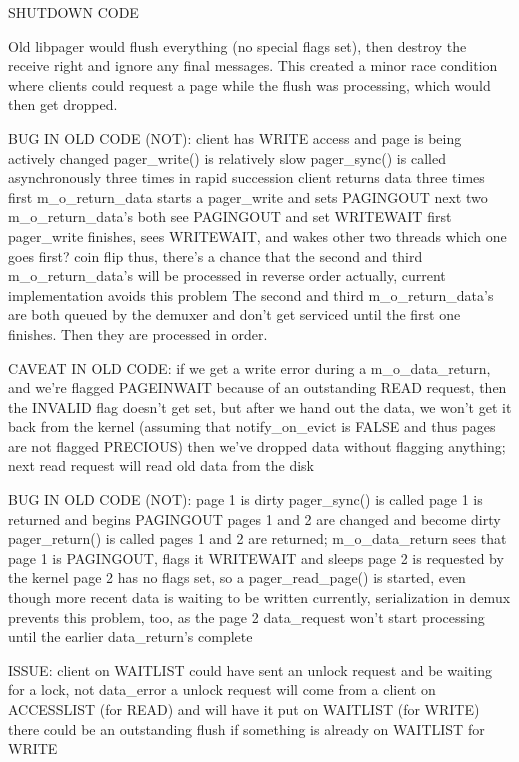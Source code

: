 \documentclass{article}
\begin{document}
SHUTDOWN CODE

Old libpager would flush everything (no special flags set), then
destroy the receive right and ignore any final messages.  This created
a minor race condition where clients could request a page while the
flush was processing, which would then get dropped.


BUG IN OLD CODE (NOT):
  client has WRITE access and page is being actively changed
  pager_write() is relatively slow
  pager_sync() is called asynchronously three times in rapid succession
  client returns data three times
  first m_o_return_data starts a pager_write and sets PAGINGOUT
  next two m_o_return_data's both see PAGINGOUT and set WRITEWAIT
  first pager_write finishes, sees WRITEWAIT, and wakes other two threads
  which one goes first?  coin flip
  thus, there's a chance that the second and third m_o_return_data's will be processed in reverse order
  actually, current implementation avoids this problem
    The second and third m_o_return_data's are both queued by the demuxer and don't
    get serviced until the first one finishes.  Then they are processed in order.

CAVEAT IN OLD CODE:
  if we get a write error during a m_o_data_return, and we're flagged PAGEINWAIT because of an outstanding READ request,
  then the INVALID flag doesn't get set, but after we hand out the data, we won't get it back from the kernel
  (assuming that notify_on_evict is FALSE and thus pages are not flagged PRECIOUS)
  then we've dropped data without flagging anything; next read request will read old data from the disk

BUG IN OLD CODE (NOT):
  page 1 is dirty
  pager_sync() is called
  page 1 is returned and begins PAGINGOUT
  pages 1 and 2 are changed and become dirty
  pager_return() is called
  pages 1 and 2 are returned; m_o_data_return sees that page 1 is PAGINGOUT, flags it WRITEWAIT and sleeps
  page 2 is requested by the kernel
  page 2 has no flags set, so a pager_read_page() is started, even though more recent data is waiting to be written
  currently, serialization in demux prevents this problem, too, as the page 2 data_request won't start
    processing until the earlier data_return's complete


ISSUE:
  client on WAITLIST could have sent an unlock request and be waiting for a lock, not data_error
  a unlock request will come from a client on ACCESSLIST (for READ) and will have it put on WAITLIST (for WRITE)
  there could be an outstanding flush if something is already on WAITLIST for WRITE
\end{document}
